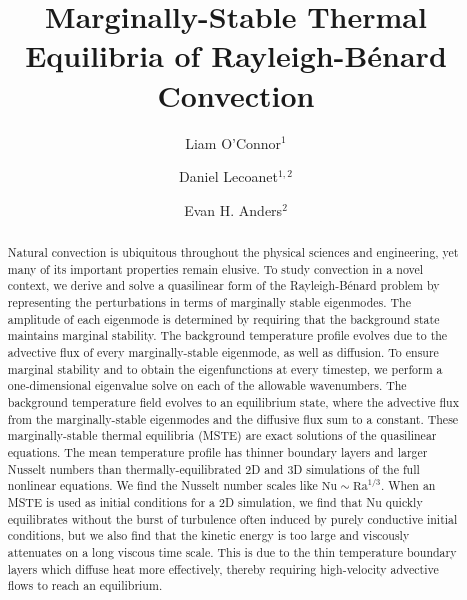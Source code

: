 \documentclass[reprint,amsmath,amssymb,aps,nofootinbib]{revtex4-1}
\newcommand\Ra{\mathrm{Ra}}
\newcommand\Nu{\mathrm{Nu}}
\begin{document}
\title{Marginally-Stable Thermal Equilibria of Rayleigh-Bénard Convection}

\author{Liam O'Connor$^1$}
\author{Daniel Lecoanet$^{1, 2}$}
\author{Evan H. Anders$^2$}

\begin{abstract}
    Natural convection is ubiquitous throughout the physical sciences and engineering, yet many of its important properties remain elusive.
    To study convection in a novel context, we derive and solve a quasilinear form of the Rayleigh-Bénard problem by representing the perturbations in terms of marginally stable eigenmodes.
    The amplitude of each eigenmode is determined by requiring that the background state maintains marginal stability.
    The background temperature profile evolves due to the advective flux of every marginally-stable eigenmode, as well as diffusion.
    To ensure marginal stability and to obtain the eigenfunctions at every timestep, we perform a one-dimensional eigenvalue solve on each of the allowable wavenumbers.
    The background temperature field evolves to an equilibrium state, where the advective flux from the marginally-stable eigenmodes and the diffusive flux sum to a constant.
    These marginally-stable thermal equilibria (MSTE) are exact solutions of the quasilinear equations.
    The mean temperature profile has thinner boundary layers and larger Nusselt numbers than thermally-equilibrated 2D and 3D simulations of the full nonlinear equations.
    We find the Nusselt number scales like $\Nu \sim\Ra^{1/3}$.
    When an MSTE is used as initial conditions for a 2D simulation, we find that Nu quickly equilibrates without the burst of turbulence often induced by purely conductive initial conditions, but we also find that the kinetic energy is too large and viscously attenuates on a long viscous time scale.
    This is due to the thin temperature boundary layers which diffuse heat more effectively, thereby requiring high-velocity advective flows to reach an equilibrium.
\end{abstract}

\maketitle
\end{document}
